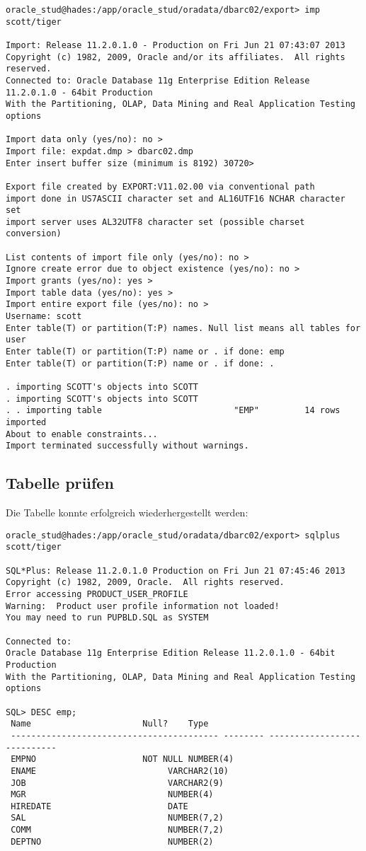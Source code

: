 \documentclass[11pt,a4paper,parskip=half]{scrartcl}
\begin{document}
\begin{lstlisting}
oracle_stud@hades:/app/oracle_stud/oradata/dbarc02/export> imp scott/tiger

Import: Release 11.2.0.1.0 - Production on Fri Jun 21 07:43:07 2013
Copyright (c) 1982, 2009, Oracle and/or its affiliates.  All rights reserved.
Connected to: Oracle Database 11g Enterprise Edition Release 11.2.0.1.0 - 64bit Production
With the Partitioning, OLAP, Data Mining and Real Application Testing options

Import data only (yes/no): no > 
Import file: expdat.dmp > dbarc02.dmp
Enter insert buffer size (minimum is 8192) 30720> 

Export file created by EXPORT:V11.02.00 via conventional path
import done in US7ASCII character set and AL16UTF16 NCHAR character set
import server uses AL32UTF8 character set (possible charset conversion)

List contents of import file only (yes/no): no > 
Ignore create error due to object existence (yes/no): no > 
Import grants (yes/no): yes > 
Import table data (yes/no): yes > 
Import entire export file (yes/no): no > 
Username: scott
Enter table(T) or partition(T:P) names. Null list means all tables for user
Enter table(T) or partition(T:P) name or . if done: emp
Enter table(T) or partition(T:P) name or . if done: .

. importing SCOTT's objects into SCOTT
. importing SCOTT's objects into SCOTT
. . importing table                          "EMP"         14 rows imported
About to enable constraints...
Import terminated successfully without warnings.
\end{lstlisting}

\subsection{Tabelle prüfen}
Die Tabelle konnte erfolgreich wiederhergestellt werden:

\begin{lstlisting}
oracle_stud@hades:/app/oracle_stud/oradata/dbarc02/export> sqlplus scott/tiger

SQL*Plus: Release 11.2.0.1.0 Production on Fri Jun 21 07:45:46 2013
Copyright (c) 1982, 2009, Oracle.  All rights reserved.
Error accessing PRODUCT_USER_PROFILE
Warning:  Product user profile information not loaded!
You may need to run PUPBLD.SQL as SYSTEM

Connected to:
Oracle Database 11g Enterprise Edition Release 11.2.0.1.0 - 64bit Production
With the Partitioning, OLAP, Data Mining and Real Application Testing options

SQL> DESC emp;
 Name					   Null?    Type
 ----------------------------------------- -------- ----------------------------
 EMPNO					   NOT NULL NUMBER(4)
 ENAME						    VARCHAR2(10)
 JOB						    VARCHAR2(9)
 MGR						    NUMBER(4)
 HIREDATE					    DATE
 SAL						    NUMBER(7,2)
 COMM						    NUMBER(7,2)
 DEPTNO 					    NUMBER(2)
\end{lstlisting}
\end{document}
